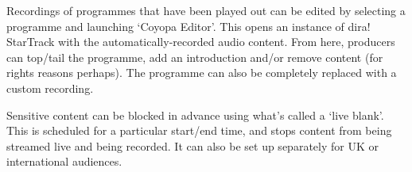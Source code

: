 Recordings of programmes that have been played out can be edited by
selecting a programme and launching `Coyopa Editor'. This opens an instance of
dira! StarTrack with the automatically-recorded audio content. From here,
producers can top/tail the programme, add an introduction and/or remove content
(for rights reasons perhaps). The programme can also be completely replaced
with a custom recording.

Sensitive content can be blocked in advance using what's called a `live blank'.
This is scheduled for a particular start/end time, and stops content from being
streamed live and being recorded. It can also be set up separately for UK or
international audiences.
